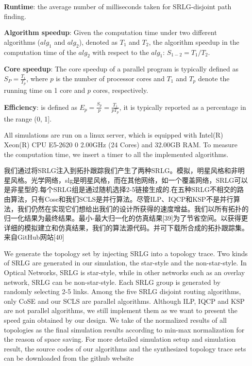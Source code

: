 \textbf{Runtime}: the average number of milliseconds taken for SRLG-disjoint path finding.


\textbf{Algorithm speedup}: Given the computation time under two different  algorithms ($alg_1$ and $alg_2$), denoted as $T_1$ and $T_2$, the algorithm speedup in the computation time of the $alg_2$ with respect to the $alg_1$: ${S_{1 - 2}} = T_1/T_2$.


 \textbf{Core speedup}: The core speedup \cite{grama2003introduction} of a parallel program is typically defined as $S_P=\frac{T_1}{T_p}$,
where $p$ is the number of processor cores and $T_1$ and $T_p$ denote the running time on 1 core and $p$ cores, respectively.


 \textbf{Efficiency}: is defined \cite{grama2003introduction} as $E_p=\frac{S_p}{p}=\frac{T_1}{pT_p}$,
it is typically reported as a percentage in the range (0, 1].




All simulations are run on a linux server, which is equipped with Intel(R) Xeon(R) CPU E5-2620 0 \@ 2.00GHz (24 Cores) and 32.00GB RAM. To measure the computation time, we insert a timer to all the implemented algorithms.


我们通过将SRLG注入到拓扑跟踪我们产生了两种SRLG。模拟，明星风格和非明星风格。光学网络，slg是明星风格，而在其他网络，如一个覆盖网络，SRLG可以是非星型的.每个SRLG组是通过随机选择2-5链接生成的.在五种SRLG不相交的路由算法，只有Cose和我们SCLS是并行算法。尽管ILP、IQCP和KSP不是并行算法，我们仍然在实现它们想给出我们的设计所获得的速度增益。我们以所有拓扑的归一化结果为最终结果。最小-最大归一化的仿真结果[39]为了节省空间。以获得更详细的模拟建立和仿真结果，我们的算法源代码。并可下载所合成的拓扑跟踪集。来自GitHub网站[40]


We generate the topology set by injecting SRLG into a topology trace. Two kinds of SRLG are generated in our simulation, the star-style and the non-star-style. In Optical Networks, SRLG is star-style, while in other networks such as an overlay network, SRLG can be non-star-style. Each SRLG group is generated by randomly selecting 2-5 links. Among the five SRLG disjoint routing algorithms, only CoSE and our SCLS are parallel algorithms. Although ILP, IQCP and KSP are not parallel algorithms, we still implement them as we want to present the speed gain obtained by our design. We take of the normalized results  of all topologies as the final simulation results according to min-max normalization \cite{tax2000feature} for the reason of space saving. For more detailed simulation setup and simulation result, the source codes of our algorithms and the synthesized topology trace sets can be downloaded from the github website \cite{code}




